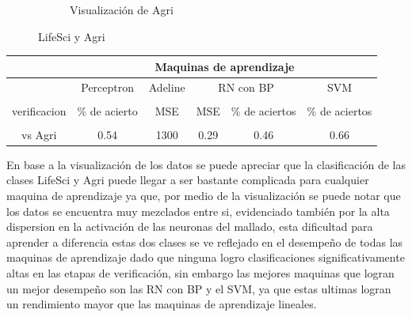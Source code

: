 \documentclass{article}
\theoremstyle{mytheoremstyle}
\theoremstyle{mytheoremstyle}
\theoremstyle{myproblemstyle}
\begin{document}
\begin{itemize}
\begin{figure}[!ht]
\begin{subfigure}[b]{0.45\textwidth}
            \caption{Visualización de Agri}
            \label{fig:Agri}
          \end{subfigure}
          \caption{LifeSci y Agri}
          \label{fig:LifeSciAgri}
        \end{figure}

        \newpage

        \begin{longtable}{cccccc}
          \cline{2-6}
                                                                          & \multicolumn{5}{c}{Maquinas de aprendizaje}                                                                             \\ \cline{2-6}
          \endfirsthead
          \endhead
                                                                          & Perceptron                                  & Adeline & \multicolumn{2}{c}{RN con BP} & SVM                             \\ \hline
          \begin{tabular}[c]{@{}c@{}}Tipo de \\ verificacion\end{tabular} & \% de acierto                               & MSE     & MSE                           & \% de aciertos & \% de aciertos \\ \hline
          \begin{tabular}[c]{@{}c@{}}LifeSci\\ vs Agri\end{tabular}       & 0.54                                        & 1300    & 0.29                          & 0.46           & 0.66           \\ \hline
        \end{longtable}

        En base a la visualización de los datos se puede apreciar que la clasificación de las clases LifeSci y Agri puede llegar a ser bastante complicada para cualquier maquina de aprendizaje ya que, por medio de la visualización se puede notar que los datos se encuentra muy mezclados entre si, evidenciado también por la alta dispersion en la activación de las neuronas del mallado, esta dificultad para aprender a diferencia estas dos clases se ve reflejado en el desempeño de todas las maquinas de aprendizaje dado que ninguna logro clasificaciones significativamente altas en las etapas de verificación, sin embargo las mejores maquinas que logran un mejor desempeño son las RN con BP y el SVM, ya que estas ultimas logran un rendimiento mayor que las maquinas de aprendizaje lineales.

\end{itemize}
\end{document}
